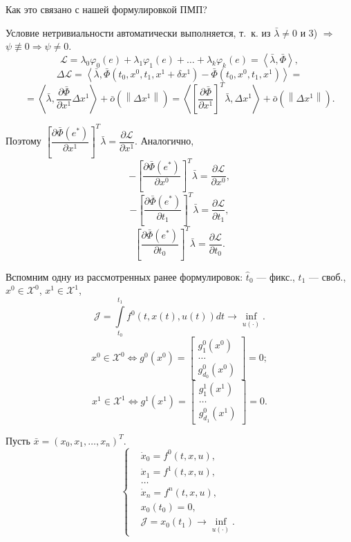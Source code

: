 \documentclass[12pt, a4paper]{article}
\theoremstyle{rusdef}
\newcommand\scalar[1]{\left < #1 \right >} %
\newcommand{\X}{\mathscr{X}} %
\renewcommand{\L}{\mathscr{L}} %
\renewcommand{\d}{\partial} %
\newcommand{\norm}[1]{\left\lVert #1 \right\rVert} %
\DeclareMathOperator*{\thus}{\Rightarrow} %
\begin{document}
Как это связано с нашей формулировкой ПМП?

Условие нетривиальности автоматически выполняется, т.~к. из $\bar{\lambda} \neq 0$ и 3) $\thus$ \\ $\psi \not\equiv 0 \thus \psi \neq 0$.
$$
\L = \lambda_0\varphi_0(e) + \lambda_1\varphi_1(e) + \ldots + \lambda_k\varphi_k(e) = \scalar{\bar{\lambda}, \bar{\Phi}},
$$
$$
\Delta\L = \scalar{\bar{\lambda}, \bar{\Phi}(t_0, x^0, t_1, x^1 + \delta x^1) - \bar{\Phi}(t_0, x^0, t_1, x^1)} =
$$
$$
= \scalar{\bar{\lambda}, \dfrac{\d \bar{\Phi}}{\d x^1} \Delta x^1} + \bar{o}(\norm{\Delta x^1}) = \scalar{ \left[\dfrac{\d \bar{\Phi}}{\d x^1}\right]^T \bar{\lambda}, \Delta x^1} + \bar{o}(\norm{\Delta x^1}).
$$

Поэтому $\left[\dfrac{\d \bar{\Phi}(e^*)}{\d x^1}\right]^T \bar{\lambda} = \dfrac{\d \L}{\d x^1}$. Аналогично,
$$
-\left[\dfrac{\d \bar{\Phi}(e^*)}{\d x^0}\right]^T \bar{\lambda} = \dfrac{\d \L}{\d x^0},
$$
$$
-\left[\dfrac{\d \bar{\Phi}(e^*)}{\d t_1}\right]^T \bar{\lambda} = \dfrac{\d \L}{\d t_1},
$$
$$
\left[\dfrac{\d \bar{\Phi}(e^*)}{\d t_0}\right]^T \bar{\lambda} = \dfrac{\d \L}{\d t_0}.
$$

Вспомним одну из рассмотренных ранее формулировок:
$\hat{t}_0$ --- фикс., $t_1$ --- своб., $x^0 \in \X^0$, $x^1 \in \X^1$,
$$
\mathcal{J} = \int\limits_{t_0}^{t_1} f^0(t, x(t), u(t)) dt \to \inf\limits_{u(\cdot)}.
$$
$$
x^0 \in \X^0 \Leftrightarrow g^0(x^0) = \left[\begin{matrix} g_1^0(x^0)\\ \ldots \\ g_{d_0}^0 (x^0) \end{matrix}\right] = 0;
$$
$$
x^1 \in \X^1 \Leftrightarrow g^1(x^1) = \left[\begin{matrix} g_1^1(x^1)\\ \ldots \\ g_{d_1}^0 (x^1) \end{matrix}\right] = 0.
$$

Пусть $\bar{x} = (x_0, x_1, \ldots, x_n)^T$.
$$
\left\{
\begin{aligned}
& \dot{x}_0 = f^0(t,x,u), \\
& \dot{x}_1 = f^1(t,x,u), \\
& \ldots \\
& \dot{x}_n = f^n(t,x,u), \\
& x_0(t_0) = 0, \\
& \mathcal{J} = x_0(t_1) \to \inf\limits_{u(\cdot)}.
\end{aligned}
\right.
$$
\end{document}

